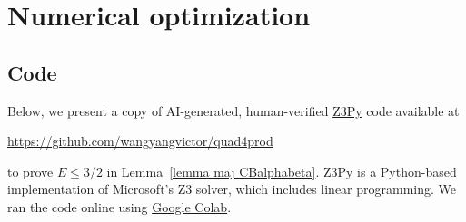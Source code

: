 \documentclass[reqno, 12pt]{amsart}
\theoremstyle{plain}
\theoremstyle{definition}
\theoremstyle{remark}
\renewcommand{\le}{\leqslant}
\begin{document}


\appendix

\section{Numerical optimization}
\label{code}

\subsection*{Code}
Below, we present a copy of AI-generated, human-verified
\href{https://pypi.org/project/z3-solver/}{Z3Py} code
available at
\begin{center}
\url{https://github.com/wangyangvictor/quad4prod}
\end{center}
to prove $E\le 3/2$ in Lemma~\ref{lemma maj CBalphabeta}.
Z3Py is a Python-based implementation of Microsoft's Z3 solver,
which includes linear programming.
We ran the code online
using \href{https://colab.research.google.com/}{Google Colab}.
\end{document}
